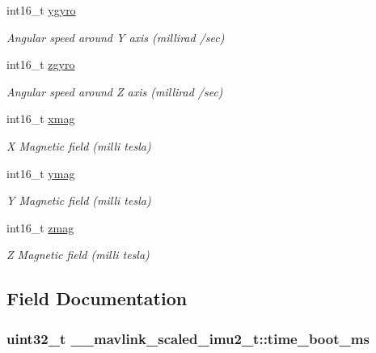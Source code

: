 \begin{DoxyCompactItemize}
int16\+\_\+t \hyperlink{struct____mavlink__scaled__imu2__t_ae237b460b73135955dd2fe9b49eff4f3}{ygyro}
\begin{DoxyCompactList}\small\item\em Angular speed around Y axis (millirad /sec) \end{DoxyCompactList}\item 
int16\+\_\+t \hyperlink{struct____mavlink__scaled__imu2__t_a9545e373347b74f510bfdb4ba1df372a}{zgyro}
\begin{DoxyCompactList}\small\item\em Angular speed around Z axis (millirad /sec) \end{DoxyCompactList}\item 
int16\+\_\+t \hyperlink{struct____mavlink__scaled__imu2__t_a5c1bc2a4c5e9f770abc9e1225338851b}{xmag}
\begin{DoxyCompactList}\small\item\em X Magnetic field (milli tesla) \end{DoxyCompactList}\item 
int16\+\_\+t \hyperlink{struct____mavlink__scaled__imu2__t_aae860698ee10f61be7e4ebffa3ed7d4e}{ymag}
\begin{DoxyCompactList}\small\item\em Y Magnetic field (milli tesla) \end{DoxyCompactList}\item 
int16\+\_\+t \hyperlink{struct____mavlink__scaled__imu2__t_ae9a37d697427541d41a0cc7dd8b2a42f}{zmag}
\begin{DoxyCompactList}\small\item\em Z Magnetic field (milli tesla) \end{DoxyCompactList}\end{DoxyCompactItemize}


\subsection{Field Documentation}
\hypertarget{struct____mavlink__scaled__imu2__t_ac9888bbb82d6d9f401bb24f96750c8b5}{
\subsubsection[{time\+\_\+boot\+\_\+ms}]{\setlength{\rightskip}{0pt plus 5cm}uint32\+\_\+t \+\_\+\+\_\+mavlink\+\_\+scaled\+\_\+imu2\+\_\+t\+::time\+\_\+boot\+\_\+ms}}\label{struct____mavlink__scaled__imu2__t_ac9888bbb82d6d9f401bb24f96750c8b5}


